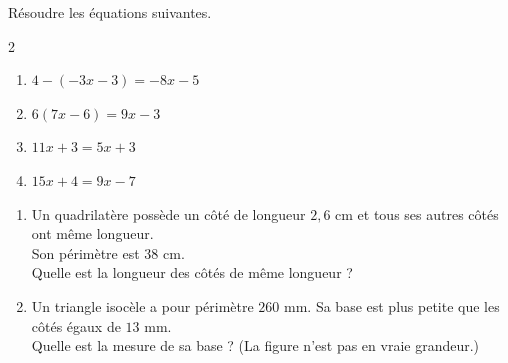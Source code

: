 {%
\begin{Exercice}
Résoudre les équations suivantes.
\leavevmode\vspace{-\baselineskip}
\begin{multicols}{2}
\begin{enumerate}[itemsep=1em]
	\item \begin{minipage}[t]{\linewidth}$4-(-3x-3)=-8x-5$\\\end{minipage}
	\item \begin{minipage}[t]{\linewidth}$6(7x-6)=9x-3$\\\end{minipage}
	\item \begin{minipage}[t]{\linewidth}$11x+3=5x+3$\\\end{minipage}
	\item \begin{minipage}[t]{\linewidth}$15x+4=9x-7$\\\end{minipage}
\end{enumerate}
\end{multicols}
\end{Exercice}



\begin{Exercice}
\leavevmode\vspace{-\baselineskip}
\begin{enumerate}[itemsep=1em]
	\item \begin{minipage}[t]{\linewidth}Un quadrilatère possède un côté de longueur $2{,}6$ cm et tous ses autres côtés ont même longueur.\\Son périmètre est $38$ cm.\\Quelle est la longueur des côtés de même longueur ?\end{minipage}
	\item \begin{minipage}[t]{\linewidth}Un triangle isocèle a pour périmètre $260$ mm. Sa base est plus petite que les côtés égaux de $13$ mm.\\Quelle est la mesure de sa base ? (La figure n'est pas en vraie grandeur.)\\
	\begin{center}
	\begin{tikzpicture}[baseline,scale = 0.8]


\end{tikzpicture}
\end{center}
\end{minipage}
\end{enumerate}
\end{Exercice}}
